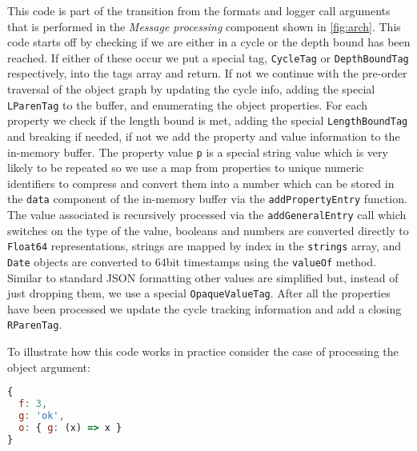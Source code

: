 This code is part of the transition from the formats and logger call arguments 
that is performed in the \emph{Message processing} component shown in \autoref{fig:arch}. This code 
starts off by checking if we are either in a cycle or the depth bound has been 
reached. If either of these occur we put a special tag, \texttt{CycleTag} or 
\texttt{DepthBoundTag} respectively, into the tags array and return. If not we 
continue with the pre-order traversal of the object graph by updating the cycle 
info, adding the special \texttt{LParenTag} to the buffer, and enumerating the 
object properties. For each property we check if the length bound is met, adding 
the special \texttt{LengthBoundTag} and breaking if needed, if not we add the 
property and value information to the in-memory buffer. The property value \texttt{p} 
is a special string value which is very likely to be repeated so we use a map 
from properties to unique numeric identifiers to compress and convert them into 
a number which can be stored in the \texttt{data} component of the in-memory buffer 
via the \texttt{addPropertyEntry} function. The value associated is recursively 
processed via the \texttt{addGeneralEntry} call which switches on the type of the 
value, booleans and numbers are converted directly to \texttt{Float64} representations, 
strings are mapped by index in the \texttt{strings} array, and \texttt{Date} objects 
are converted to $64$bit timestamps using the \texttt{valueOf} method. Similar to 
standard JSON formatting other values are simplified but, instead of just dropping 
them, we use a special \texttt{OpaqueValueTag}. After all the properties have 
been processed we update the cycle tracking information and add a closing 
\texttt{RParenTag}.

To illustrate how this code works in practice consider the case of processing the 
object argument:

\begin{lstlisting}[language=JavaScript,basicstyle=\scriptsize,numbers=none]
{
  f: 3,
  g: 'ok',
  o: { g: (x) => x }
}
\end{lstlisting}

